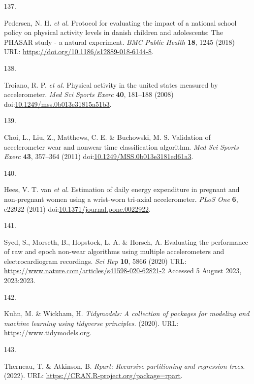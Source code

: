 \documentclass[
  10pt,
]{scrbook}
\newlength{\cslhangindent}
\newlength{\csllabelwidth}
\newlength{\cslentryspacingunit} %
\newenvironment{CSLReferences}[2] %
 {%
  \setlength{\parindent}{0pt}
  \ifodd #1
  \let\oldpar\par
  \def\par{\hangindent=\cslhangindent\oldpar}
  \fi
  \setlength{\parskip}{#2\cslentryspacingunit}
 }%
 {}
\newcommand{\CSLLeftMargin}[1]{\parbox[t]{\csllabelwidth}{#1}}
\newcommand{\CSLRightInline}[1]{\parbox[t]{\linewidth - \csllabelwidth}{#1}\break}
\begin{document}
\begin{CSLReferences}{0}{0}
\leavevmode{}%
\CSLLeftMargin{137. }%
\CSLRightInline{Pedersen, N. H. \emph{et al.} Protocol for evaluating
the impact of a national school policy on physical activity levels in
danish children and adolescents: The PHASAR study - a natural
experiment. \emph{BMC Public Health} \textbf{18}, 1245 (2018) URL:
\url{https://doi.org/10.1186/s12889-018-6144-8}.}

\leavevmode{}%
\CSLLeftMargin{138. }%
\CSLRightInline{Troiano, R. P. \emph{et al.} Physical activity in the
united states measured by accelerometer. \emph{Med Sci Sports Exerc}
\textbf{40}, 181--188 (2008)
doi:\href{https://doi.org/10.1249/mss.0b013e31815a51b3}{10.1249/mss.0b013e31815a51b3}.}

\leavevmode{}%
\CSLLeftMargin{139. }%
\CSLRightInline{Choi, L., Liu, Z., Matthews, C. E. \& Buchowski, M. S.
Validation of accelerometer wear and nonwear time classification
algorithm. \emph{Med Sci Sports Exerc} \textbf{43}, 357--364 (2011)
doi:\href{https://doi.org/10.1249/MSS.0b013e3181ed61a3}{10.1249/MSS.0b013e3181ed61a3}.}

\leavevmode{}%
\CSLLeftMargin{140. }%
\CSLRightInline{Hees, V. T. van \emph{et al.} Estimation of daily energy
expenditure in pregnant and non-pregnant women using a wrist-worn
tri-axial accelerometer. \emph{{PLoS} One} \textbf{6}, e22922 (2011)
doi:\href{https://doi.org/10.1371/journal.pone.0022922}{10.1371/journal.pone.0022922}.}

\leavevmode{}%
\CSLLeftMargin{141. }%
\CSLRightInline{Syed, S., Morseth, B., Hopstock, L. A. \& Horsch, A.
Evaluating the performance of raw and epoch non-wear algorithms using
multiple accelerometers and electrocardiogram recordings. \emph{Sci Rep}
\textbf{10}, 5866 (2020) URL:
\url{https://www.nature.com/articles/s41598-020-62821-2} Accessed 5
August 2023, 2023:2023.}

\leavevmode{}%
\CSLLeftMargin{142. }%
\CSLRightInline{Kuhn, M. \& Wickham, H. \emph{Tidymodels: A collection
of packages for modeling and machine learning using tidyverse
principles.} (2020). URL: \url{https://www.tidymodels.org}.}

\leavevmode{}%
\CSLLeftMargin{143. }%
\CSLRightInline{Therneau, T. \& Atkinson, B. \emph{Rpart: Recursive
partitioning and regression trees}. (2022). URL:
\url{https://CRAN.R-project.org/package=rpart}.}


\end{CSLReferences}
\end{document}
